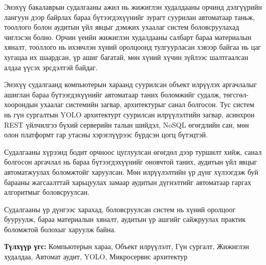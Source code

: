 
Энэхүү бакалаврын судалгааны ажил нь жижиглэн худалдааны орчинд дэлгүүрийн лангуун дээр байрлах бараа бүтээгдэхүүнийг зурагт суурилан автоматаар таньж, тооллого болон аудитын үйл явцыг дэмжих ухаалаг систем боловсруулахад чиглэсэн болно. Орчин үеийн жижиглэн худалдааны салбарт бараа материалын хяналт, тооллого нь ихэвчлэн хүний оролцоонд тулгуурласан хэвээр байгаа нь цаг хугацаа их шаардсан, үр ашиг багатай, мөн хүний хүчин зүйлээс шалтгаалсан алдаа үүсэх эрсдэлтэй байдаг.

Энэхүү судалгаанд компьютерын хараанд суурилсан объект илрүүлэх аргачлалыг ашиглан бараа бүтээгдэхүүнийг автоматаар таних боломжийг судалж, төгсгөл-хоорондын ухаалаг системийн загвар, архитектурыг санал болгосон. Тус систем нь гүн сургалтын YOLO архитектурт суурилсан илрүүлэлтийн загвар, асинхрон REST үйлчилгээ бүхий серверийн талын шийдэл, NoSQL өгөгдлийн сан, мөн олон платформт гар утасны хэрэглүүрээс бүрдсэн цогц бүтэцтэй.

Судалгааны хүрээнд бодит орчноос цуглуулсан өгөгдөл дээр туршилт хийж, санал болгосон аргачлал нь бараа бүтээгдэхүүнийг оновчтой таних, аудитын үйл явцыг автоматжуулах боломжтойг харуулсан. Мөн илрүүлэлтийн үр дүнг хүлээгдэж буй барааны жагсаалттай харьцуулах замаар аудитын дүгнэлтийг автоматаар гаргах алгоритмыг боловсруулсан.

Судалгааны үр дүнгээс харахад, боловсруулсан систем нь хүний оролцоог бууруулж, бараа материалын хяналт, аудитын үр ашгийг сайжруулах практик боломжтой болохыг харуулж байна.

\textbf{Түлхүүр үгс:} Компьютерын хараа, Объект илрүүлэлт, Гүн сургалт, Жижиглэн худалдаа, Автомат аудит, YOLO, Микросервис архитектур
